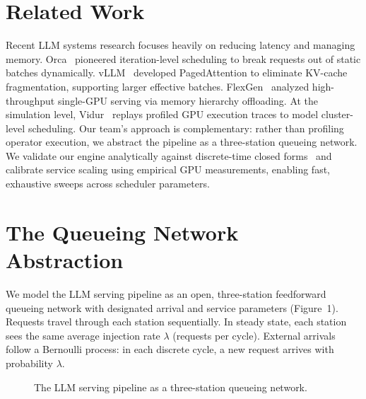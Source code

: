 \documentclass[conference]{IEEEtran}
\begin{document}
\section{Related Work}
Recent LLM systems research focuses heavily on reducing latency and managing memory. Orca~\cite{yu2022orca} pioneered iteration-level scheduling to break requests out of static batches dynamically. vLLM~\cite{kwon2023vllm} developed PagedAttention to eliminate KV-cache fragmentation, supporting larger effective batches. FlexGen~\cite{sheng2023flexgen} analyzed high-throughput single-GPU serving via memory hierarchy offloading. At the simulation level, Vidur~\cite{agrawal2024vidur} replays profiled GPU execution traces to model cluster-level scheduling. Our team's approach is complementary: rather than profiling operator execution, we abstract the pipeline as a three-station queueing network. We validate our engine analytically against discrete-time closed forms~\cite{mor2006discrete} and calibrate service scaling using empirical GPU measurements, enabling fast, exhaustive sweeps across scheduler parameters.

\section{The Queueing Network Abstraction}
We model the LLM serving pipeline as an open, three-station feedforward queueing network with designated arrival and service parameters (Figure~1). Requests travel through each station sequentially. In steady state, each station sees the same average injection rate $\lambda$ (requests per cycle). External arrivals follow a Bernoulli process: in each discrete cycle, a new request arrives with probability $\lambda$.

\begin{figure}[!t]
\centering
{}
\caption{The LLM serving pipeline as a three-station queueing network.}
\end{figure}
\end{document}
